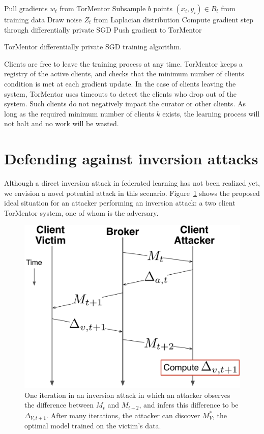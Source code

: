 \begin{algorithm}
   {
    Pull gradients $w_t$ from TorMentor\;
    Subsample $b$ points $(x_i, y_i) \in B_t$ from training data\;
    Draw noise $Z_t$ from Laplacian distribution\;
    Compute gradient step through differentially private SGD\;
    Push gradient to TorMentor
  }
  \caption{TorMentor differentially private SGD training algorithm.
  \label{alg:training}}
\end{algorithm}

Clients are free to leave the training process at any time. TorMentor
keeps a registry of the active clients, and checks that the minimum
number of clients condition is met at each gradient update. In
the case of clients leaving the system, TorMentor uses timeouts to
detect the clients who drop out of the system. Such clients do not
negatively impact the curator or other clients. As long as the required
minimum number of clients $k$ exists, the learning process will not
halt and no work will be wasted.

\section{Defending against inversion attacks}

Although a direct inversion attack in federated learning has not
been realized yet, we envision a novel potential attack in this
scenario. Figure~\ref{fig:inversion-timespace} shows the proposed ideal
situation for an attacker performing an inversion attack: a two client
TorMentor system, one of whom is the adversary.

\begin{figure}[t]
  \centering
  \includegraphics[width=.8\linewidth]{fig/inversionattack.pdf}
  \caption{One iteration in an inversion attack in which an attacker
    observes the difference between $M_t$ and $M_{t+2}$, and infers
    this difference to be $\Delta_{V,t+1}$. After many iterations,
    the attacker can discover $M^*_V$, the optimal model trained on
    the victim's data.}
  \label{fig:inversion-timespace}
\end{figure}

